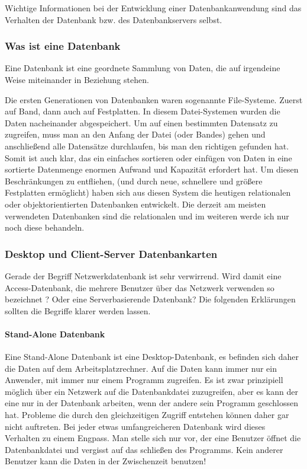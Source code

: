 Wichtige Informationen bei der Entwicklung einer Datenbankanwendung sind das Verhalten der Datenbank bzw. des Datenbankservers selbst.

\subsubsection{Was ist eine Datenbank}

Eine Datenbank ist eine geordnete Sammlung von Daten, die auf irgendeine Weise miteinander in Beziehung stehen.
 
Die ersten Generationen von Datenbanken waren sogenannte File-Systeme. Zuerst auf Band, dann auch auf Festplatten. In diesem Datei-Systemen wurden die Daten nacheinander abgespeichert. Um auf einen bestimmten Datensatz zu zugreifen, muss man an den Anfang der Datei (oder Bandes) gehen und anschließend alle Datensätze durchlaufen, bis man den richtigen gefunden hat. Somit ist auch klar, das ein einfaches sortieren oder einfügen von Daten in eine sortierte Datenmenge enormen Aufwand und Kapazität erfordert hat.
Um diesen Beschränkungen zu entfliehen, (und durch neue, schnellere und größere Festplatten ermöglicht) haben sich aus diesen System die heutigen relationalen oder objektorientierten Datenbanken entwickelt. Die derzeit am meisten verwendeten Datenbanken sind die  relationalen und im weiteren werde ich nur noch diese behandeln.

\subsubsection{Desktop und Client-Server Datenbankarten}
Gerade der Begriff Netzwerkdatenbank ist sehr verwirrend. Wird damit eine Access-Datenbank, die mehrere Benutzer über das Netzwerk verwenden so bezeichnet ? Oder eine Serverbasierende Datenbank? Die folgenden Erklärungen sollten die Begriffe klarer werden lassen.

\paragraph{Stand-Alone Datenbank}
Eine Stand-Alone Datenbank ist eine Desktop-Datenbank, es befinden sich daher die Daten auf dem Arbeitsplatzrechner. Auf die Daten kann immer nur ein Anwender, mit immer nur einem Programm zugreifen. Es ist zwar prinzipiell möglich über ein Netzwerk auf die Datenbankdatei zuzugreifen, aber es kann der eine nur in der Datenbank arbeiten, wenn der andere sein Programm geschlossen hat. Probleme die durch den gleichzeitigen Zugriff entstehen können daher gar nicht auftreten. Bei jeder etwas umfangreicheren Datenbank wird dieses Verhalten zu einem Engpass. Man stelle sich nur vor, der eine Benutzer öffnet die Datenbankdatei und vergisst auf das schließen des Programms. Kein anderer Benutzer kann die Daten in der Zwischenzeit benutzen!

